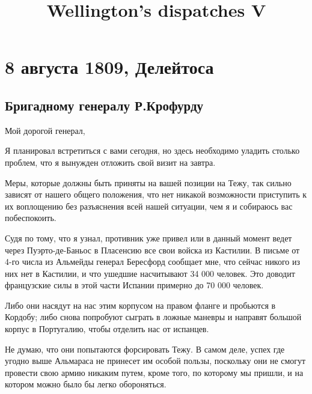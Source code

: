 \documentclass[
  oneside,
  12pt,
  titlepage]{book}
\title{Wellington's dispatches V}
\author{}
\date{\vspace{-2.5em}}
\begin{document}
\maketitle

{
\setcounter{tocdepth}{1}
\tableofcontents
}
\hypertarget{part-8-ux430ux432ux433ux443ux441ux442ux430-1809-ux434ux435ux43bux435ux439ux442ux43eux441ux430}{%
\part*{8 августа 1809, Делейтоса}\label{part-8-ux430ux432ux433ux443ux441ux442ux430-1809-ux434ux435ux43bux435ux439ux442ux43eux441ux430}}

\hypertarget{ux431ux440ux438ux433ux430ux434ux43dux43eux43cux443-ux433ux435ux43dux435ux440ux430ux43bux443-ux440.ux43aux440ux43eux444ux443ux440ux434ux443}{%
\chapter{Бригадному генералу Р.Крофурду}\label{ux431ux440ux438ux433ux430ux434ux43dux43eux43cux443-ux433ux435ux43dux435ux440ux430ux43bux443-ux440.ux43aux440ux43eux444ux443ux440ux434ux443}}

Мой дорогой генерал,

Я планировал встретиться с вами сегодня, но здесь необходимо уладить столько проблем, что я вынужден отложить свой визит на завтра.

Меры, которые должны быть приняты на вашей позиции на Тежу, так сильно зависят от нашего общего положения, что нет никакой возможности приступить к их воплощению без разъяснения всей нашей ситуации, чем я и собираюсь вас побеспокоить.

Судя по тому, что я узнал, противник уже привел или в данный момент ведет через Пуэрто-де-Баньос в Пласенсию все свои войска из Кастилии. В письме от 4-го числа из Альмейды генерал Бересфорд сообщает мне, что сейчас никого из них нет в Кастилии, и что ушедшие насчитывают 34 000 человек. Это доводит французские силы в этой части Испании примерно до 70 000 человек.

Либо они насядут на нас этим корпусом на правом фланге и пробьются в Кордобу; либо снова попробуют сыграть в ложные маневры и направят большой корпус в Португалию, чтобы отделить нас от испанцев.

Не думаю, что они попытаются форсировать Тежу. В самом деле, успех где угодно выше Альмараса не принесет им особой пользы, поскольку они не смогут провести свою армию никаким путем, кроме того, по которому мы пришли, и на котором можно было бы легко обороняться.
\end{document}

